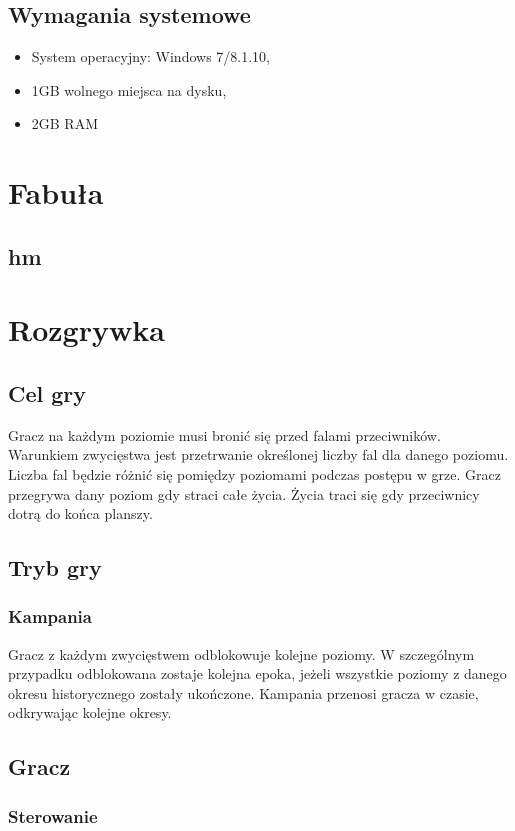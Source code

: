 \documentclass[a4paper,12pt, twoside, titlepage]{article}
\begin{document}
\subsection{Wymagania systemowe}
\begin{itemize}
	\item System operacyjny: Windows 7/8.1.10,
	\item 1GB wolnego miejsca na dysku,
	\item 2GB RAM
\end{itemize}


\newpage
\section{Fabuła}
\subsection{hm}

\newpage
\section{Rozgrywka}
\subsection{Cel gry}
Gracz na każdym poziomie musi bronić się przed falami przeciwników. Warunkiem zwycięstwa jest przetrwanie określonej liczby fal dla danego poziomu. Liczba fal będzie różnić się pomiędzy poziomami podczas postępu w grze. Gracz przegrywa dany poziom gdy straci całe życia. Życia traci się gdy przeciwnicy dotrą do końca planszy.

\subsection{Tryb gry}
\subsubsection{Kampania}
Gracz z każdym zwycięstwem odblokowuje kolejne poziomy. W szczególnym przypadku odblokowana zostaje kolejna epoka, jeżeli wszystkie poziomy z danego okresu historycznego zostały ukończone. Kampania przenosi gracza w czasie, odkrywając kolejne okresy.

\subsection{Gracz}
\subsubsection{Sterowanie}
\end{document}
